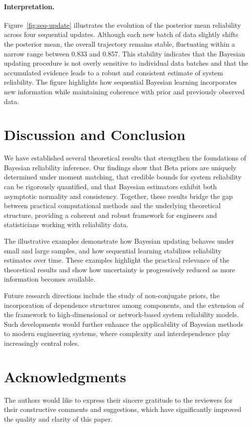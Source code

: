 \documentclass[twoside]{article}
\theoremstyle{plain}
\theoremstyle{definition}
\begin{document}
\paragraph{Interpretation.}
Figure~\ref{fig:seq-update} illustrates the evolution of the posterior mean reliability across four sequential updates. Although each new batch of data slightly shifts the posterior mean, the overall trajectory remains stable, fluctuating within a narrow range between $0.833$ and $0.857$. This stability indicates that the Bayesian updating procedure is not overly sensitive to individual data batches and that the accumulated evidence leads to a robust and consistent estimate of system reliability. The figure highlights how sequential Bayesian learning incorporates new information while maintaining coherence with prior and previously observed data.
\section{Discussion and Conclusion}
We have established several theoretical results that strengthen the foundations of Bayesian reliability inference. 
Our findings show that Beta priors are uniquely determined under moment matching, 
that credible bounds for system reliability can be rigorously quantified, 
and that Bayesian estimators exhibit both asymptotic normality and consistency. 
Together, these results bridge the gap between practical computational methods and the underlying theoretical structure, 
providing a coherent and robust framework for engineers and statisticians working with reliability data.

The illustrative examples demonstrate how Bayesian updating behaves under small and large samples, 
and how sequential learning stabilizes reliability estimates over time. 
These examples highlight the practical relevance of the theoretical results and show how uncertainty is progressively reduced as more information becomes available.

Future research directions include the study of non-conjugate priors, 
the incorporation of dependence structures among components, 
and the extension of the framework to high-dimensional or network-based system reliability models. 
Such developments would further enhance the applicability of Bayesian methods to modern engineering systems, 
where complexity and interdependence play increasingly central roles.


\section*{Acknowledgments}
The authors would like to express their sincere gratitude to the reviewers for their constructive comments and suggestions, which have significantly improved the quality and clarity of this paper.
\end{document}
